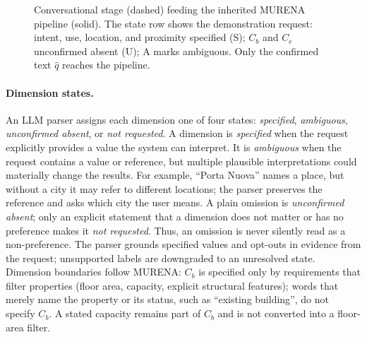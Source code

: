 \documentclass[sigconf,review]{acmart}
\begin{document}
\begin{figure}[t]
\centering
\resizebox{\columnwidth}{!}{}
\caption{Conversational stage (dashed) feeding the inherited MURENA
pipeline (solid). The state row shows the demonstration request: intent,
use, location, and proximity specified (S); $C_b$ and $C_e$ unconfirmed
absent (U); A marks ambiguous. Only the confirmed text $\hat q$ reaches the pipeline.}
\label{fig:arch}
\end{figure}

\paragraph{Dimension states.} An LLM parser assigns each dimension one
of four states: \emph{specified}, \emph{ambiguous},
\emph{unconfirmed absent}, or \emph{not requested}. A dimension is
\emph{specified} when the request explicitly provides a value the system
can interpret. It is \emph{ambiguous} when
the request contains a value or reference, but multiple plausible
interpretations could materially change the results. For example,
``Porta Nuova'' names a place, but without a city it may refer to
different locations; the parser preserves the reference and asks which
city the user means. A plain omission is \emph{unconfirmed absent}; only an explicit statement
that a dimension does not matter or has no preference makes it
\emph{not requested}. Thus, an omission is never silently read as a
non-preference. The parser grounds specified values and opt-outs in
evidence from the request; unsupported labels are downgraded to an
unresolved state. Dimension boundaries follow
MURENA: $C_b$ is specified only by requirements that filter properties
(floor area, capacity, explicit structural features); words that merely
name the property or its status, such as ``existing building'', do not
specify $C_b$. A stated capacity remains part of $C_b$ and is not
converted into a floor-area filter.
\end{document}
